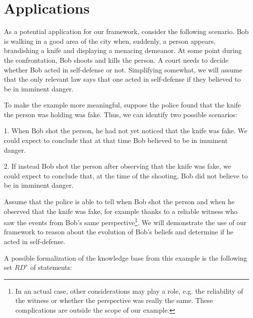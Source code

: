 \documentclass{article}
\begin{document}
\section{Applications} 

As a potential application for our framework, consider the following scenario. Bob is walking in a good area of the city when, suddenly, a person appears, brandishing a knife and displaying a menacing demeanor. At some point during the confrontation, Bob shoots and kills the person. A court needs to decide whether Bob acted in self-defense or not. Simplifying somewhat, we will assume that the only relevant law says that one acted in self-defense if they believed to be in imminent danger.

To make the example more meaningful, suppose the police found that the knife the person was holding was fake. Thus, we can identify two possible scenarios:

    1. When Bob shot the person, he had not yet noticed that the knife was fake. We could expect to conclude that at that time Bob believed to be in imminent danger.

    2. If instead Bob shot the person after observing that the knife was fake, we could expect to conclude that, at the time of the shooting, Bob did not believe to be in imminent danger.

Assume that the police is able to tell when Bob shot the person and when he observed that the knife was fake, for example thanks to a reliable witness who saw the events from Bob's same perspective\footnote{In an actual case, other considerations may play a role, e.g. the reliability of the witness or whether the perspective was really the same. These complications are outside the scope of our example.}. We will demonstrate the use of our framework to reason about the evolution of Bob's beliefs and determine if he acted in self-defense.

A possible formalization of the knowledge base from this example is the following set $RD^s$ of statements:
\end{document}
